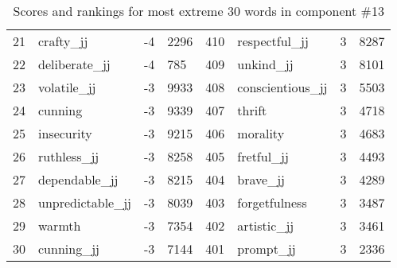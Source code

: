 \begin{table}[tbp]
\begin{tabular}{| rlr@{.}l | rlr@{.}l |}
    21 & crafty\_jj & -4 & 2296    &    410 & respectful\_jj & 3 & 8287 \\
    22 & deliberate\_jj & -4 & 785    &    409 & unkind\_jj & 3 & 8101 \\
    23 & volatile\_jj & -3 & 9933    &    408 & conscientious\_jj & 3 & 5503 \\
    24 & cunning & -3 & 9339    &    407 & thrift & 3 & 4718 \\
    25 & insecurity & -3 & 9215    &    406 & morality & 3 & 4683 \\
    26 & ruthless\_jj & -3 & 8258    &    405 & fretful\_jj & 3 & 4493 \\
    27 & dependable\_jj & -3 & 8215    &    404 & brave\_jj & 3 & 4289 \\
    28 & unpredictable\_jj & -3 & 8039    &    403 & forgetfulness & 3 & 3487 \\
    29 & warmth & -3 & 7354    &    402 & artistic\_jj & 3 & 3461 \\
    30 & cunning\_jj & -3 & 7144    &    401 & prompt\_jj & 3 & 2336 \\
    \hline
    \end{tabular}
    \caption{Scores and rankings for most extreme 30 words in component \#13} 
\end{table}
\clearpage
